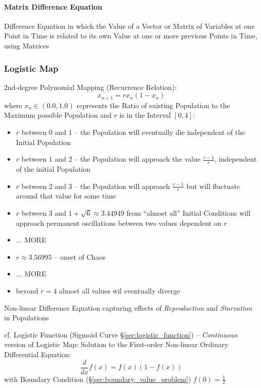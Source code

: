 {\paragraph{Matrix Difference Equation}\label{sec:matrix_difference_equation}
\hfill

Difference Equation in which the Value of a Vector or Matrix of Variables at
one Point in Time is related to its own Value at one or more previous Points in
Time, using Matrices



\subsubsection{Logistic Map}\label{sec:logistic_map}

2nd-degree Polynomial Mapping (Recurrence Relation):
\[
  x_{n+1} = rx_n(1-x_n)
\]
where $x_n \in (0.0, 1.0)$ represents the Ratio of existing Population to the
Maximum possible Population and $r$ is in the Interval $[0,4]$:
\begin{itemize}
  \item $r$ between 0 and 1 -- the Population will eventually die independent of
    the Initial Population
  \item $r$ between 1 and 2 -- the Population will approach the value
    $\frac{r-1}{r}$, independent of the initial Population
  \item $r$ between 2 and 3 -- the Population will approach $\frac{r-1}{r}$ but
    will fluctuate around that value for some time
  \item $r$ between 3 and $1 + \sqrt{6} \approx 3.44949$ from ``almost all''
    Initial Conditions will approach permanent oscillations between two values
    dependent on $r$
  \item ... MORE
  \item $r \approx 3.56995$ -- onset of Chaos
  \item ... MORE
  \item beyond $r=4$ almost all values wil eventually diverge
\end{itemize}

Non-linear Difference Equation capturing effects of \emph{Reproduction} and
\emph{Starvation} in Populations

\fist cf. Logistic Function (Sigmoid Curve \S\ref{sec:logistic_function}) --
\emph{Continuous} version of Logistic Map: Solution to the First-order
Non-linear Ordinary Differential Equation:
\[
  \frac{d}{dx}f(x) = f(x)(1 - f(x))
\]
with Boundary Condition (\S\ref{sec:boundary_value_problem}) $f(0) =
\frac{1}{2}$



}
